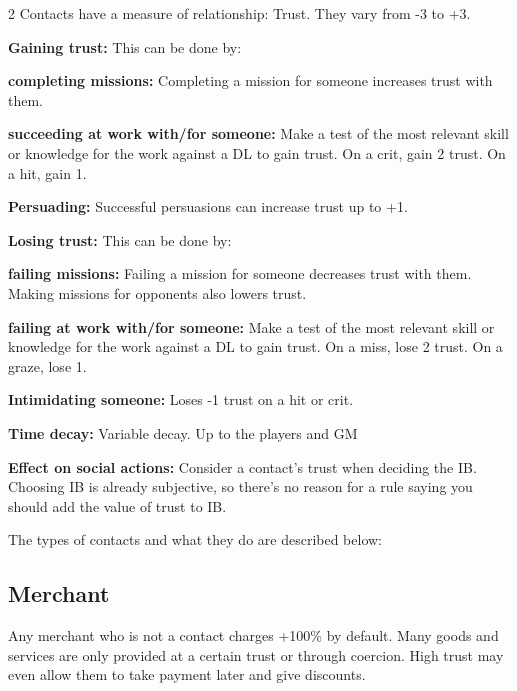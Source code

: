 \begin{multicols}{2}
Contacts have a measure of relationship: Trust. They vary from -3 to +3. 

\textbf{Gaining trust:} This can be done by:

\begin{proplist}
    \item \textbf{completing missions:} Completing a mission for someone increases trust with them.
    \item \textbf{succeeding at work with/for someone:} Make a test of the most relevant skill or knowledge for the work against a DL to gain trust. On a crit, gain 2 trust. On a hit, gain 1.
    \item \textbf{Persuading:} Successful persuasions can increase trust up to +1.  
\end{proplist} 

\textbf{Losing trust:} This can be done by:
\begin{proplist}
    \item \textbf{failing missions:} Failing a mission for someone decreases trust with them. Making missions for opponents also lowers trust.
    \item \textbf{failing at work with/for someone:} Make a test of the most relevant skill or knowledge for the work against a DL to gain trust. On a miss, lose 2 trust. On a graze, lose 1.
    \item \textbf{Intimidating someone:} Loses -1 trust on a hit or crit.
    \item \textbf{Time decay:} Variable decay. Up to the players and GM
\end{proplist} 

\begin{dnote}
    \textbf{Effect on social actions:} Consider a contact's trust when deciding the IB. Choosing IB is already subjective, so there's no reason for a rule saying you should add the value of trust to IB.
\end{dnote}


The types of contacts and what they do are described below: \\

\subsection{Merchant}

Any merchant who is not a contact charges +100\% by default. Many goods and services are only provided at a certain trust or through coercion. High trust may even allow them to take payment later and give discounts. \\


\end{multicols}
